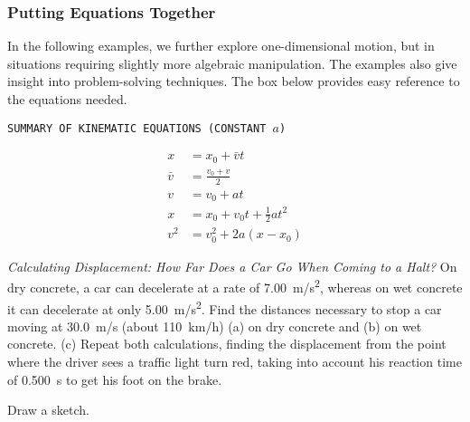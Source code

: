 \documentclass[main-ap-physics.tex]{subfiles}
\begin{document}
\subsubsection*{Putting Equations Together}

In the following examples, we further explore one-dimensional motion, but in situations requiring slightly more algebraic manipulation. The examples also give insight into problem-solving techniques. The box below provides easy reference to the equations needed.

\vspace{1em}

\cyanhrule

\begin{center}
    \texttt{SUMMARY OF KINEMATIC EQUATIONS (CONSTANT $a$)}
\end{center}

\vspace{-2em}

\begin{align}
    x &= x_0 + \bar{v} t \label{X0SPQW} \\[1ex]
    \bar{v} &= \frac{v_0 + v}{2} \\[1ex]
    v &= v_0 + at \\[1ex]
    x &= x_0 + v_0t + \frac{1}{2} a t^2 \label{eo2SPc} \\[1ex]
    v^2 &= v_0^2 + 2a (x - x_0) \label{EEJoew}
\end{align}

\cyanhrule

\begin{example}
    \textit{Calculating Displacement: How Far Does a Car Go When Coming to a Halt?} On dry concrete, a car can decelerate at a rate of \SI{7.00}{m/s^2}, whereas on wet concrete it can decelerate at only \SI{5.00}{m/s^2}. Find the distances necessary to stop a car moving at \SI{30.0}{m/s} (about \SI{110}{km/h}) (a) on dry concrete and (b) on wet concrete. (c) Repeat both calculations, finding the displacement from the point where the driver sees a traffic light turn red, taking into account his reaction time of \SI{0.500}{s} to get his foot on the brake.
\end{example}

\Solution Draw a sketch.

\begin{center}
\end{center}
\end{document}
